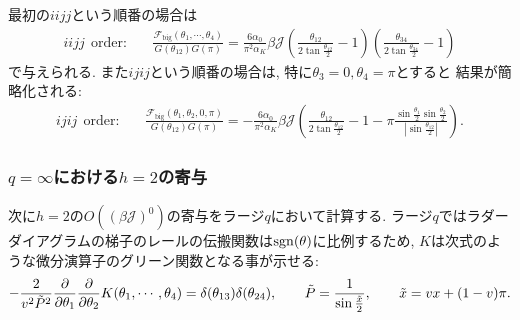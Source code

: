 最初の$iijj$という順番の場合は
\begin{align}
	iijj\ \ \mathrm{order:}\hspace{20pt}
	\frac{\mathcal{F}_{\mathrm{big}}(\theta_1, \cdots, \theta_4)}{G(\theta_{12})G(\pi)}
	= \frac{6\alpha_0}{\pi^2\alpha_K}\beta\mathcal{J}
		\left(
			\frac{\theta_{12}}{2\tan\frac{\theta_{12}}{2}} - 1
		\right)
		\left(
			\frac{\theta_{34}}{2\tan\frac{\theta_{34}}{2}} - 1
		\right)
	\label{eq:h_2_contribution_in_iijj_order}
\end{align}
で与えられる. また$ijij$という順番の場合は, 特に$\theta_3 = 0, \theta_4 = \pi$とすると
結果が簡略化される:
\begin{align}
	ijij\ \ \mathrm{order:}\hspace{20pt}
	\frac{\mathcal{F}_{\mathrm{big}}(\theta_1, \theta_2, 0, \pi)}{G(\theta_{12})G(\pi)}
	= - \frac{6\alpha_0}{\pi^2\alpha_K}\beta\mathcal{J}
		\left(
			\frac{\theta_{12}}{2\tan\frac{\theta_{12}}{2}} - 1
			- \pi \frac{\sin\frac{\theta_1}{2}\sin\frac{\theta_2}{2}}{|\sin\frac{\theta_{12}}{2}|}
		\right).
	\label{eq:h_2_contribution_in_ijij_order}
\end{align}

\subsubsection{$q=\infty$における$h=2$の寄与}
次に$h=2$の$O((\beta\mathcal{J})^0)$の寄与をラージ$q$において計算する. 
ラージ$q$ではラダーダイアグラムの梯子のレールの伝搬関数は$\mathrm{sgn}(\theta)$に比例するため, 
$K$は次式のような微分演算子のグリーン関数となる事が示せる:
\begin{align}
	-\frac{2}{v^2\tilde{P}^2}\frac{\partial}{\partial \theta_1}\frac{\partial}{\partial \theta_2}K(\theta_1, \cdots, \theta_4)
	= \delta(\theta_{13})\delta(\theta_{24}),\hspace{20pt}
	\tilde{P} = \frac{1}{\sin\frac{\tilde{x}}{2}},\hspace{20pt}
	\tilde{x} = vx + (1 - v)\pi.
\end{align}

